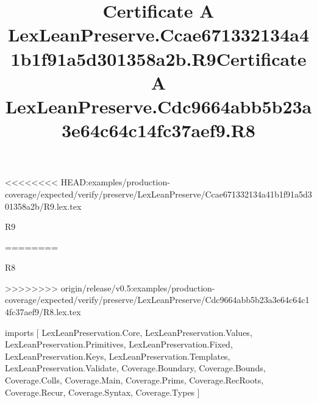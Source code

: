 <<<<<<<< HEAD:examples/production-coverage/expected/verify/preserve/LexLeanPreserve/Ccae671332134a41b1f91a5d301358a2b/R9.lex.tex
\begin{lexlean}{R9}
\title{Certificate A LexLeanPreserve.Ccae671332134a41b1f91a5d301358a2b.R9}
========
\begin{lexlean}{R8}
\title{Certificate A LexLeanPreserve.Cdc9664abb5b23a3e64c64c14fc37aef9.R8}
>>>>>>>> origin/release/v0.5:examples/production-coverage/expected/verify/preserve/LexLeanPreserve/Cdc9664abb5b23a3e64c64c14fc37aef9/R8.lex.tex
\begin{coremodule}
imports [
  LexLeanPreservation.Core,
  LexLeanPreservation.Values,
  LexLeanPreservation.Primitives,
  LexLeanPreservation.Fixed,
  LexLeanPreservation.Keys,
  LexLeanPreservation.Templates,
  LexLeanPreservation.Validate,
  Coverage.Boundary,
  Coverage.Bounds,
  Coverage.Colls,
  Coverage.Main,
  Coverage.Prims,
  Coverage.RecRoots,
  Coverage.Recur,
  Coverage.Syntax,
  Coverage.Types
]


\end{coremodule}
\end{lexlean}
\end{lexlean}
